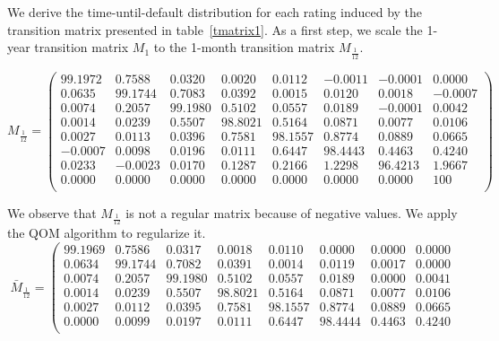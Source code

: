 \documentclass[11pt,fleqn]{book} %
\begin{document}
\begin{example}
	\label{ex:pdftm}
	We derive the time-until-default distribution for each rating induced by the 
	transition matrix presented in table~\ref{tmatrix1}. As a first step, we 
	scale the 1-year transition matrix $M_1$ to the 1-month transition matrix 
	$M_{\frac{1}{12}}$.
	{\small
	\begin{displaymath}
		M_{\frac{1}{12}} = \left(
		\begin{array}{cccccccc}
			99.1972 &  0.7588 &  0.0320 &  0.0020 &  0.0112 & -0.0011 & -0.0001 &   0.0000 \\
			 0.0635 & 99.1744 &  0.7083 &  0.0392 &  0.0015 &  0.0120 &  0.0018 &  -0.0007 \\
			 0.0074 &  0.2057 & 99.1980 &  0.5102 &  0.0557 &  0.0189 & -0.0001 &   0.0042 \\
			 0.0014 &  0.0239 &  0.5507 & 98.8021 &  0.5164 &  0.0871 &  0.0077 &   0.0106 \\
			 0.0027 &  0.0113 &  0.0396 &  0.7581 & 98.1557 &  0.8774 &  0.0889 &   0.0665 \\
			-0.0007 &  0.0098 &  0.0196 &  0.0111 &  0.6447 & 98.4443 &  0.4463 &   0.4240 \\
			 0.0233 & -0.0023 &  0.0170 &  0.1287 &  0.2166 &  1.2298 & 96.4213 &   1.9667 \\
			 0.0000 &  0.0000 &  0.0000 &  0.0000 &  0.0000 &  0.0000 &  0.0000 & 100 \\
		\end{array}
		\right)
	\end{displaymath}\par}
	We observe that $M_{\frac{1}{12}}$ is not a regular matrix because of 
	negative values. We apply the QOM algorithm to regularize it.
	{\small
	\begin{displaymath}
		\bar{M}_{\frac{1}{12}} = \left(
		\begin{array}{cccccccc}
			99.1969 &  0.7586 &  0.0317 &  0.0018 &  0.0110 &  0.0000 &  0.0000 &   0.0000 \\
			 0.0634 & 99.1744 &  0.7082 &  0.0391 &  0.0014 &  0.0119 &  0.0017 &   0.0000 \\
			 0.0074 &  0.2057 & 99.1980 &  0.5102 &  0.0557 &  0.0189 &  0.0000 &   0.0041 \\
			 0.0014 &  0.0239 &  0.5507 & 98.8021 &  0.5164 &  0.0871 &  0.0077 &   0.0106 \\
			 0.0027 &  0.0112 &  0.0395 &  0.7581 & 98.1557 &  0.8774 &  0.0889 &   0.0665 \\
			 0.0000 &  0.0099 &  0.0197 &  0.0111 &  0.6447 & 98.4444 &  0.4463 &   0.4240 \\

\end{array}
\end{displaymath}}
\end{example}
\end{document}
